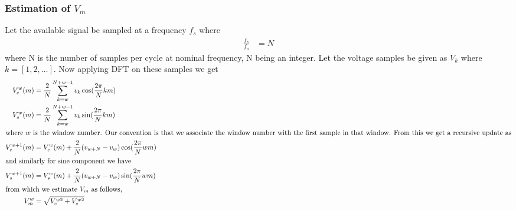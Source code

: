 \subsubsection{Estimation of $V_m$}
Let the available signal be sampled at a frequency $f_s$ where
\begin{align}
\label{algo1}
\frac{f_s}{f_o}&=N
\end{align}
where N is the number of samples per cycle at nominal frequency, N being an integer. Let the voltage samples be given as $V_k$ where $k=[1,2,\dots]$. Now applying DFT on these samples we get
\begin{align}
V_c^w(m)&=\frac{2}{N}\sum_{k=w}^{N+w-1} v_k\cos(\frac{2\pi}{N}km)\nonumber\\
V_s^w(m)&=\frac{2}{N}\sum_{k=w}^{N+w-1} v_k\sin(\frac{2\pi}{N}km)\nonumber\\
\intertext{where $w$ is the window number. Our convention is that we associate the window number with the first sample in that window. From this we get a recursive update as}
\label{algo2}
V_c^{w+1}(m)&=V_c^w(m) + \frac{2}{N}(v_{w+N}-v_{w})\cos(\frac{2\pi}{N}wm)\\
\intertext{and similarly for sine component we have}
\label{algo3}
V_s^{w+1}(m)&=V_s^w(m) + \frac{2}{N}(v_{w+N}-v_{w})\sin(\frac{2\pi}{N}wm)\\
\intertext{from which we estimate $V_m$ as follows,}
\label{algo4}
V_m^w&=\sqrt{V_c^{w2}+V_s^{w2}}
\end{align}
